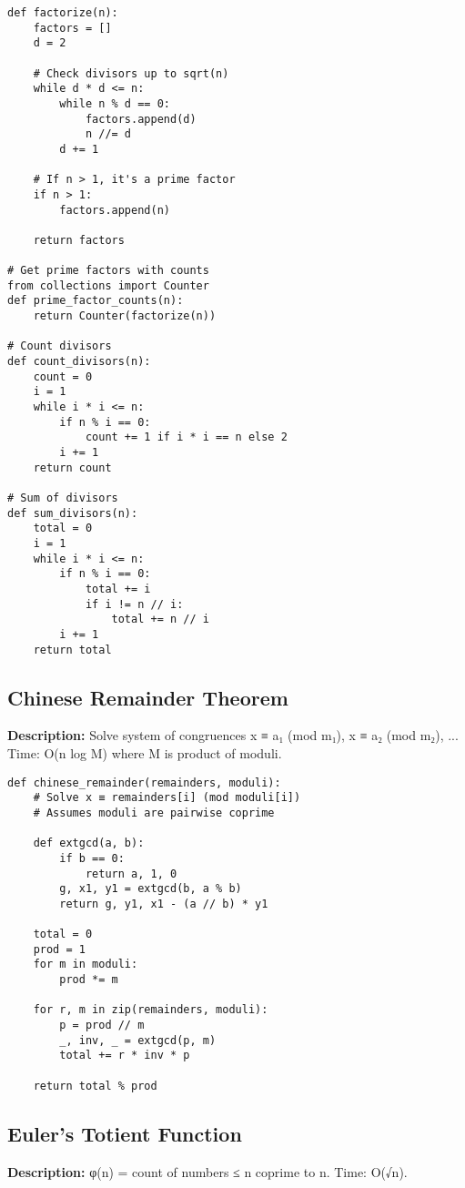 \begin{lstlisting}
def factorize(n):
    factors = []
    d = 2
    
    # Check divisors up to sqrt(n)
    while d * d <= n:
        while n % d == 0:
            factors.append(d)
            n //= d
        d += 1
    
    # If n > 1, it's a prime factor
    if n > 1:
        factors.append(n)
    
    return factors

# Get prime factors with counts
from collections import Counter
def prime_factor_counts(n):
    return Counter(factorize(n))

# Count divisors
def count_divisors(n):
    count = 0
    i = 1
    while i * i <= n:
        if n % i == 0:
            count += 1 if i * i == n else 2
        i += 1
    return count

# Sum of divisors
def sum_divisors(n):
    total = 0
    i = 1
    while i * i <= n:
        if n % i == 0:
            total += i
            if i != n // i:
                total += n // i
        i += 1
    return total
\end{lstlisting}

\subsection{Chinese Remainder Theorem}
\textbf{Description:} Solve system of congruences x ≡ a₁ (mod m₁), x ≡ a₂ (mod m₂), ... Time: O(n log M) where M is product of moduli.

\begin{lstlisting}
def chinese_remainder(remainders, moduli):
    # Solve x ≡ remainders[i] (mod moduli[i])
    # Assumes moduli are pairwise coprime
    
    def extgcd(a, b):
        if b == 0:
            return a, 1, 0
        g, x1, y1 = extgcd(b, a % b)
        return g, y1, x1 - (a // b) * y1
    
    total = 0
    prod = 1
    for m in moduli:
        prod *= m
    
    for r, m in zip(remainders, moduli):
        p = prod // m
        _, inv, _ = extgcd(p, m)
        total += r * inv * p
    
    return total % prod
\end{lstlisting}

\subsection{Euler's Totient Function}
\textbf{Description:} φ(n) = count of numbers ≤ n coprime to n. Time: O(√n).

